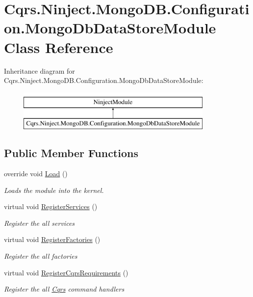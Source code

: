\hypertarget{classCqrs_1_1Ninject_1_1MongoDB_1_1Configuration_1_1MongoDbDataStoreModule}{}\section{Cqrs.\+Ninject.\+Mongo\+D\+B.\+Configuration.\+Mongo\+Db\+Data\+Store\+Module Class Reference}
\label{classCqrs_1_1Ninject_1_1MongoDB_1_1Configuration_1_1MongoDbDataStoreModule}
Inheritance diagram for Cqrs.\+Ninject.\+Mongo\+D\+B.\+Configuration.\+Mongo\+Db\+Data\+Store\+Module\+:\begin{figure}[H]
\begin{center}
\leavevmode
\includegraphics[height=2.000000cm]{classCqrs_1_1Ninject_1_1MongoDB_1_1Configuration_1_1MongoDbDataStoreModule}
\end{center}
\end{figure}
\subsection*{Public Member Functions}
\begin{DoxyCompactItemize}
\item 
override void \hyperlink{classCqrs_1_1Ninject_1_1MongoDB_1_1Configuration_1_1MongoDbDataStoreModule_a29425d24f414443a98a59dad09dcadfc}{Load} ()
\begin{DoxyCompactList}\small\item\em Loads the module into the kernel. \end{DoxyCompactList}\item 
virtual void \hyperlink{classCqrs_1_1Ninject_1_1MongoDB_1_1Configuration_1_1MongoDbDataStoreModule_a4500dc7d8760b2cb9ac70fa90acc7ac9}{Register\+Services} ()
\begin{DoxyCompactList}\small\item\em Register the all services \end{DoxyCompactList}\item 
virtual void \hyperlink{classCqrs_1_1Ninject_1_1MongoDB_1_1Configuration_1_1MongoDbDataStoreModule_a8b2ad4e3919423212f0e23614fda4473}{Register\+Factories} ()
\begin{DoxyCompactList}\small\item\em Register the all factories \end{DoxyCompactList}\item 
virtual void \hyperlink{classCqrs_1_1Ninject_1_1MongoDB_1_1Configuration_1_1MongoDbDataStoreModule_ad1630c7f82d9a0a452682e855277280d}{Register\+Cqrs\+Requirements} ()
\begin{DoxyCompactList}\small\item\em Register the all \hyperlink{namespaceCqrs}{Cqrs} command handlers \end{DoxyCompactList}\end{DoxyCompactItemize}


